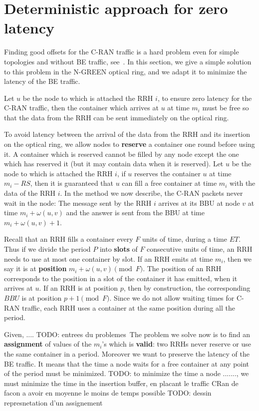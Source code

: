 \documentclass[10pt, conference, letterpaper]{IEEEtran}
\newcommand{\todo}[1]{{\color{red} TODO: {#1}}}
\begin{document}
\section{Deterministic approach for zero latency} \label{sec:deterministicalgorithms}

Finding good offsets for the C-RAN traffic is a hard problem even for simple topologies and without BE traffic, see~\cite{dominique2018deterministic}. In this section, we give a simple solution to this problem in the N-GREEN optical ring, and we adapt it to minimize the latency of the BE traffic.

Let $u$ be the node to which is attached the RRH $i$, to ensure zero latency for the C-RAN traffic, then the container which arrives at $u$ at time $m_i$ must be free so that the data from the RRH can be sent immediately on the optical ring. 

To avoid latency between the arrival of the data from the RRH and its insertion on the optical ring, 
we allow nodes to \textbf{reserve} a container one round before using it. A container which is reserved cannot be filled by any node except the one which has reserved it (but it may contain data when it is reserved). 
Let $u$ be the node to which is attached the RRH $i$, if $u$ reserves the container $u$ at time $m_i - RS$, then it is guaranteed that $u$ can fill a free container at time $m_i$ with the data of the RRH $i$.
In the method we now describe, the C-RAN packets never wait in the node: The message sent by the RRH $i$ arrives at its BBU at node $v$ at time $m_i + \omega(u,v)$ and the answer is sent from the BBU at time $m_i + \omega(u,v) +1$.

Recall that an RRH fills a container every $F$ units of time, during a time $ET$. 
Thus if we divide the period $P$ into \textbf{slots} of $F$ consecutive units of time, an RRH needs to use at most one container by slot. If an RRH emits at time $m_i$, then we say it is at \textbf{position} $m_i + \omega(u,v)\pmod F$. 
The position of an RRH corresponds to the position in a slot of the container it has emitted, when it arrives at $u$. 
If an RRH is at position $p$, then by construction, the corresponding $BBU$ is at position $p+1\pmod F$. Since we do not allow waiting times for C-RAN traffic, each RRH uses a container at the same position during all the period. 

Given, .... \todo{entrees du problemes} The problem we solve now is to find an \textbf{assignment} of values of the $m_i$'s which is \textbf{valid}: two RRHs never reserve or use the same container in a period. Moreover we want to preserve the latency of the BE traffic. It means that the time a node waits for a free container at any point of the period must be minimized.\todo{to minimize the time a node ......., we must minimize the time in the insertion buffer, en placant le traffic CRan de facon a avoir en moyenne le moins de temps possible}
\todo{dessin represnetation d'un assignement}
 
\end{document}
